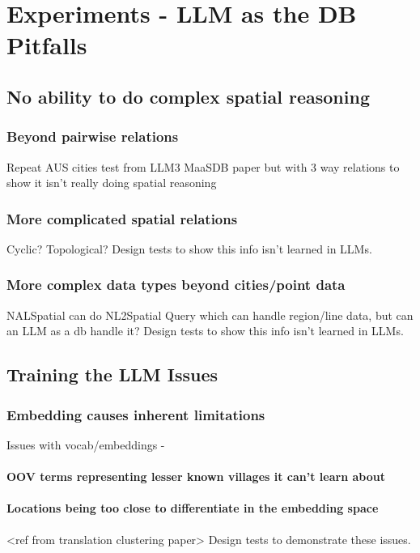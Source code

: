 \section{Experiments - LLM as the DB Pitfalls}
\label{section:experiments}


\subsection{No ability to do complex spatial reasoning}

\subsubsection{Beyond pairwise relations}
Repeat AUS cities test from LLM3 MaaSDB paper but with 3 way relations to show it isn't really doing spatial reasoning

\subsubsection{More complicated spatial relations}
Cyclic? Topological?
Design tests to show this info isn't learned in LLMs.

\subsubsection{More complex data types beyond cities/point data}
NALSpatial can do NL2Spatial Query which can handle region/line data, but can an LLM as a db handle it?
Design tests to show this info isn't learned in LLMs.


\subsection{Training the LLM Issues}

    \subsubsection{Embedding causes inherent limitations}
    Issues with vocab/embeddings - 
    \paragraph{OOV terms representing lesser known villages it can't learn about}
    \paragraph{Locations being too close to differentiate in the embedding space}
        <ref from translation clustering paper>
        Design tests to demonstrate these issues.

